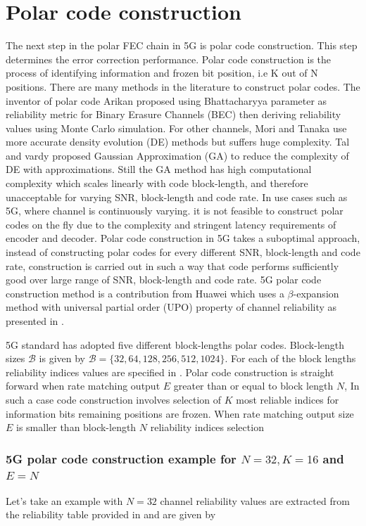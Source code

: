 \section{Polar code construction}
The next step in the polar FEC chain in 5G is polar code construction. This step determines the error correction performance. Polar code construction is the process of identifying information and frozen bit position, i.e K out of N positions. There are many methods in the literature to construct polar codes. The inventor of polar code Arikan \cite{Arikan} proposed using Bhattacharyya parameter as reliability metric for Binary Erasure Channels (BEC) then deriving reliability values using Monte Carlo simulation. For other channels, Mori and Tanaka \cite{MoriTanakaDE} use more accurate density evolution (DE) methods but suffers huge complexity. Tal and vardy proposed Gaussian Approximation (GA) to reduce the complexity of DE with approximations. Still the GA method has high computational complexity which scales linearly with code block-length, and therefore unacceptable for varying SNR, block-length and code rate. In use cases such as 5G, where channel is continuously varying. it is not feasible to construct polar codes on the fly due to the complexity and stringent latency requirements of encoder and decoder. Polar code construction in 5G takes a suboptimal approach, instead of constructing polar codes for every different SNR, block-length and code rate, construction is carried out in such a way that code performs sufficiently good over large range of SNR, block-length and code rate. 5G polar code construction method is a contribution from Huawei which uses a $\beta$-expansion method with universal partial order (UPO) property of channel reliability as presented in \cite{betaExpansion}.

5G standard has adopted five different block-lengths polar codes. Block-length sizes $\mathcal{B}$ is given by $\mathcal{B} = \{32,64,128,256,512,1024\}$.
For each of the block lengths reliability indices values are specified in \cite{3gpp.38.212}. Polar code construction is straight forward when rate matching output $E$ greater than or equal to block length $N$, In such a case code construction involves selection of $K$ most reliable indices for information bits remaining positions are frozen. When rate matching output size $E$ is smaller than block-length $N$ reliability indices selection

\subsubsection*{5G polar code construction example for $N = 32, K = 16$ and $E = N$} \label{E_greaterThan_N}
Let's take an example with $N = 32$ channel reliability values are extracted from the reliability table provided in \cite{3gpp.38.212} and are given by

